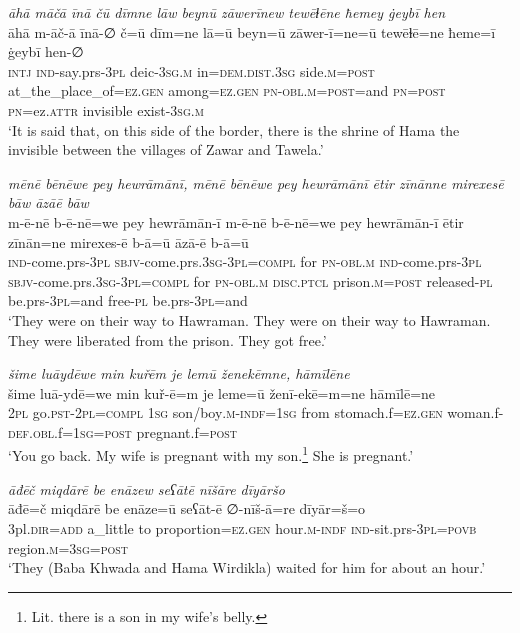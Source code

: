\ea \label{BP.178}
\textit{āhā māčā īnā čū dīmne lāw beynū zāwerīnew tewēɫēne ħemey ġeybī hen} \\ 
\gll āhā m-āč-ā īnā-∅ č=ū dīm=ne lā=ū beyn=ū zāwer-ī=ne=ū tewēɫē=ne ħeme=ī ġeybī hen-∅ \\ 
 \textsc{intj} \textsc{ind-}say.prs\textsc{-3pl} deic\textsc{-3sg}\textsc{.m} in=\textsc{dem.dist}\textsc{.3sg} side\textsc{.m}\textsc{=\textsc{post}} at\_the\_place\_of\textsc{=ez.gen} among\textsc{=ez.gen} \textsc{pn}\textsc{-obl}\textsc{.m}\textsc{=\textsc{post}}=and \textsc{pn}\textsc{=\textsc{post}} \textsc{pn}=ez.\textsc{attr} invisible exist\textsc{-3sg}\textsc{.m} \\ 
\glt `It is said that, on this side of the border, there is the shrine of Hama the invisible between the villages of Zawar and Tawela.'
\z 
 
\ea \label{BP.179}
\textit{mēnē bēnēwe pey hewrāmānī, mēnē bēnēwe pey hewrāmānī ētir zīnānne mirexesē bāw āzāē bāw} \\ 
\gll m-ē-nē b-ē-nē=we pey hewrāmān-ī m-ē-nē b-ē-nē=we pey hewrāmān-ī ētir zīnān=ne mirexes-ē b-ā=ū āzā-ē b-ā=ū \\ 
 \textsc{ind-}come.prs\textsc{-3pl} \textsc{sbjv-}come.prs\textsc{.3sg}\textsc{-3pl}\textsc{=compl} for \textsc{pn}\textsc{-obl}\textsc{.m} \textsc{ind-}come.prs\textsc{-3pl} \textsc{sbjv-}come.prs\textsc{.3sg}\textsc{-3pl}\textsc{=compl} for \textsc{pn}\textsc{-obl}\textsc{.m} \textsc{disc.ptcl} prison\textsc{.m}\textsc{=\textsc{post}} released\textsc{\textsc{-pl}} be.prs\textsc{-3pl}=and free\textsc{\textsc{-pl}} be.prs\textsc{-3pl}=and \\ 
\glt `They were on their way to Hawraman. They were on their way to Hawraman. They were liberated from the prison. They got free.'
\z 
 
\ea \label{BP.185}
\textit{šime luāydēwe min kuřēm je lemū ženekēmne, hāmīlēne} \\ 
\gll šime luā-ydē=we min kuř-ē=m je leme=ū ženī-ekē=m=ne hāmīlē=ne \\ 
 \textsc{2pl} go\textsc{.pst}-\textsc{2pl}\textsc{=compl} \textsc{1sg} son/boy\textsc{.m}\textsc{-indf}\textsc{=\textsc{1sg}} from stomach.f\textsc{=ez.gen} woman.f\textsc{-def}\textsc{.obl}.f\textsc{=\textsc{1sg}}\textsc{=\textsc{post}} pregnant.f\textsc{=\textsc{post}} \\ 
\glt `You go back. My wife is pregnant with my son.\footnote{Lit. there is a son in my wife’s belly.} She is pregnant.'
\z 
 
\ea \label{BP.189}
\textit{āđēč miqdārē be enāzew seʕātē nīšāre dīyāršo} \\ 
\gll āđē=č miqdārē be enāze=ū seʕāt-ē ∅-nīš-ā=re dīyār=š=o \\ 
 3pl\textsc{.dir}\textsc{=add} a\_little to proportion\textsc{=ez.gen} hour\textsc{.m}\textsc{-indf} \textsc{ind-}sit.prs\textsc{-3pl}\textsc{=\textsc{povb}} region\textsc{.m}\textsc{=3sg}\textsc{=\textsc{post}} \\ 
\glt `They (Baba Khwada and Hama Wirdikla) waited for him for about an hour.'
\z 
 
